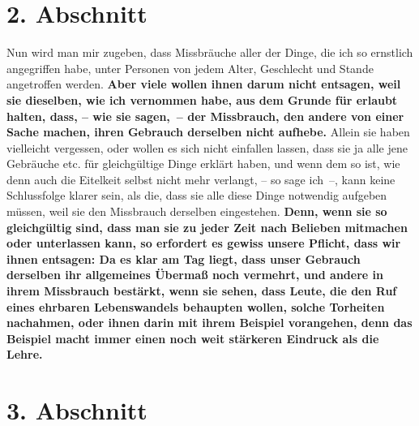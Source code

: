 \section{2. Abschnitt} \label{kap18_ab2}

Nun wird man mir zugeben, dass Missbräuche aller der Dinge, die ich so ernstlich
angegriffen habe, unter Personen von jedem Alter, Geschlecht und Stande
angetroffen werden. \label{ref:18_02_einwand}\textbf{Aber viele wollen ihnen
darum nicht entsagen, weil
sie
dieselben, wie ich vernommen habe, aus dem Grunde für erlaubt halten, dass, --
wie sie sagen,~-- der Missbrauch, den andere von einer Sache machen, ihren
Gebrauch derselben nicht aufhebe.} Allein sie haben vielleicht vergessen, oder
wollen es sich nicht einfallen lassen, dass sie ja alle jene Gebräuche etc. für
gleichgültige Dinge erklärt haben, und wenn dem so ist, wie denn auch die
Eitelkeit selbst nicht mehr verlangt, -- so sage ich~--, kann keine Schlussfolge
klarer sein, als die, dass sie alle diese Dinge notwendig aufgeben müssen, weil
sie den Missbrauch derselben eingestehen. \textbf{Denn, wenn sie so gleichgültig
sind,
dass man sie zu jeder Zeit nach Belieben mitmachen oder unterlassen kann, so
erfordert es gewiss unsere Pflicht, dass wir ihnen entsagen: Da es klar am Tag
liegt, dass unser Gebrauch derselben ihr allgemeines Übermaß noch vermehrt, und
andere in ihrem Missbrauch bestärkt, wenn sie sehen, dass Leute, die den Ruf
eines ehrbaren Lebenswandels behaupten wollen, solche Torheiten nachahmen, oder
ihnen darin mit ihrem Beispiel vorangehen, denn das Beispiel macht immer einen
noch weit stärkeren Eindruck als die Lehre.}

\section{3. Abschnitt} \label{kap18_ab3}

